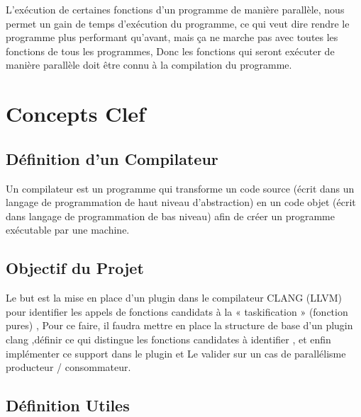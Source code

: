 \documentclass[12pt,titlepage]{article}
\begin{document}
 L’exécution de  certaines fonctions d'un programme de manière parallèle, nous permet un gain de temps d'exécution du programme, ce qui veut dire rendre le programme plus performant qu'avant, mais ça ne marche pas avec toutes  les fonctions de tous les programmes, Donc  les fonctions qui seront exécuter de manière parallèle doit être connu à la compilation du programme.

\section{Concepts Clef}

\subsection{Définition d'un Compilateur}

Un compilateur est un programme qui transforme un code source (écrit dans un langage de programmation de haut niveau d'abstraction) en un code objet (écrit dans langage de programmation de bas niveau) afin de créer un programme exécutable par une machine.

\subsection{Objectif du Projet}

Le but est la mise en place d’un plugin dans le compilateur CLANG (LLVM) pour identifier les appels de fonctions candidats à la « taskification » (fonction pures) , Pour ce faire, il faudra mettre en place la structure de base d’un plugin clang ,définir ce qui distingue les fonctions candidates à identifier , et enfin implémenter ce support dans le plugin et  Le valider sur un cas de parallélisme producteur / consommateur.


\subsection{Définition Utiles}
\end{document}
